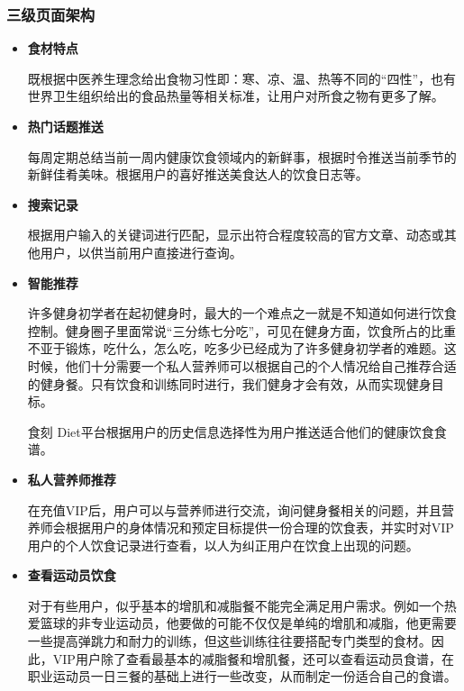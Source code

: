 \documentclass[UTF8,12pt]{ctexart}
\numberwithin{figure}{section}%
\begin{document}
\begin{spacing}{2}
\begin{itemize}
\end{itemize}

\newpage
\subsubsection{三级页面架构}

\begin{itemize}
	\item\textbf{食材特点}
	
	既根据中医养生理念给出食物习性即：寒、凉、温、热等不同的“四性”，也有世界卫生组织给出的食品热量等相关标准，让用户对所食之物有更多了解。
	
	\item\textbf{热门话题推送}
	
	每周定期总结当前一周内健康饮食领域内的新鲜事，根据时令推送当前季节的新鲜佳肴美味。根据用户的喜好推送美食达人的饮食日志等。
	
	\item\textbf{搜索记录}
	
	根据用户输入的关键词进行匹配，显示出符合程度较高的官方文章、动态或其他用户，以供当前用户直接进行查询。
	
	
	\item\textbf{智能推荐}
	
	许多健身初学者在起初健身时，最大的一个难点之一就是不知道如何进行饮食控制。健身圈子里面常说“三分练七分吃”，可见在健身方面，饮食所占的比重不亚于锻炼，吃什么，怎么吃，吃多少已经成为了许多健身初学者的难题。这时候，他们十分需要一个私人营养师可以根据自己的个人情况给自己推荐合适的健身餐。只有饮食和训练同时进行，我们健身才会有效，从而实现健身目标。
	
	食刻 Diet平台根据用户的历史信息选择性为用户推送适合他们的健康饮食食谱。	
	
	\newpage
	
	\item\textbf{私人营养师推荐}
	
	在充值VIP后，用户可以与营养师进行交流，询问健身餐相关的问题，并且营养师会根据用户的身体情况和预定目标提供一份合理的饮食表，并实时对VIP用户的个人饮食记录进行查看，以人为纠正用户在饮食上出现的问题。
	
	\item\textbf{查看运动员饮食}
	
	对于有些用户，似乎基本的增肌和减脂餐不能完全满足用户需求。例如一个热爱篮球的非专业运动员，他要做的可能不仅仅是单纯的增肌和减脂，他更需要一些提高弹跳力和耐力的训练，但这些训练往往要搭配专门类型的食材。因此，VIP用户除了查看最基本的减脂餐和增肌餐，还可以查看运动员食谱，在职业运动员一日三餐的基础上进行一些改变，从而制定一份适合自己的食谱。
	

\end{itemize}
\end{spacing}
\end{document}
